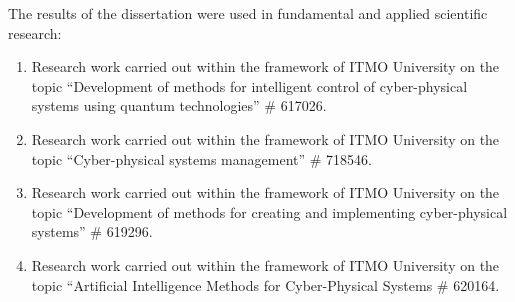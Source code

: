 {\implementationEn} The results of the dissertation were used in fundamental and applied scientific research:

\begin{enumerate}[beginpenalty=10000]
	\item Research work carried out within the framework of ITMO University on the topic ``Development of methods for intelligent control of cyber-physical systems using quantum technologies'' \# 617026.
	\item Research work carried out within the framework of ITMO University on the topic ``Cyber-physical systems management''  \# 718546.
	\item Research work carried out within the framework of ITMO University on the topic ``Development of methods for creating and implementing cyber-physical systems'' \# 619296.
	\item Research work carried out within the framework of ITMO University on the topic ``Artificial Intelligence Methods for Cyber-Physical Systems \# 620164.
\end{enumerate}


